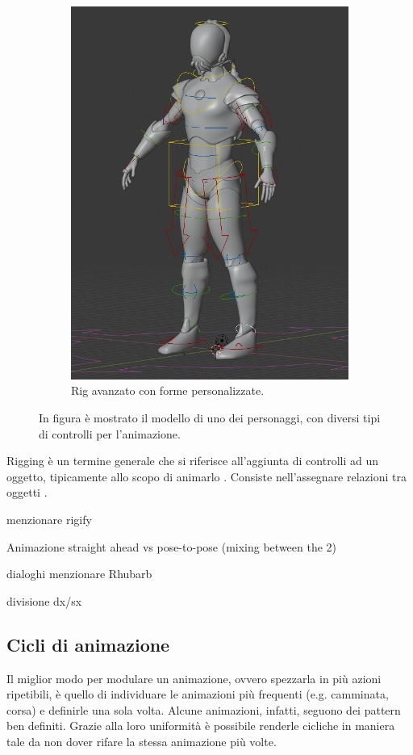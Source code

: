 \begin{figure}
\begin{subfigure}{.33\textwidth}
  \includegraphics[width=\linewidth]{Figures/rig2}
  \caption{Rig avanzato con forme personalizzate.}
  \label{fig:rig2}
\end{subfigure}
\decoRule
\caption[Rig a confronto]{In figura è mostrato il modello di uno dei personaggi, con diversi tipi di controlli per l'animazione.}
\label{fig:rig}
\end{figure}

Rigging è un termine generale che si riferisce all'aggiunta di controlli ad un oggetto, tipicamente allo scopo di animarlo \parencite{blendDoc}.
Consiste nell'assegnare relazioni tra oggetti \parencite{BlendTut}.

menzionare rigify

Animazione straight ahead vs pose-to-pose (mixing between the 2)

dialoghi
menzionare Rhubarb

divisione dx/sx

\subsection{Cicli di animazione}
Il miglior modo per modulare un animazione, ovvero spezzarla in più azioni ripetibili, è quello di individuare le animazioni più frequenti (e.g. camminata, corsa) e definirle una sola volta.
Alcune animazioni, infatti, seguono dei pattern ben definiti.
Grazie alla loro uniformità è possibile renderle cicliche in maniera tale da non dover rifare la stessa animazione più volte.
